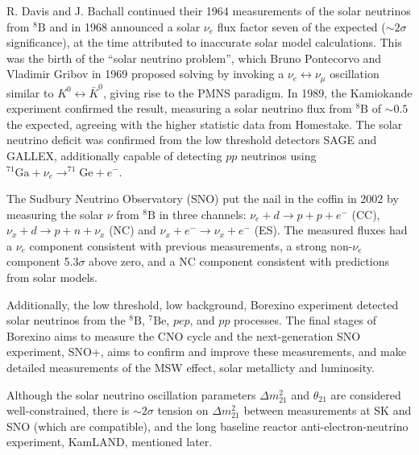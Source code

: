 R. Davis and J. Bachall continued their 1964 measurements\cite{davis} of the solar neutrinos from $^{8}\text{B}$ and in 1968\cite{davis_sun} announced a solar $\nu_e$ flux factor seven of the expected ($\sim2\sigma$ significance), at the time attributed to inaccurate solar model calculations. This was the birth of the ``solar neutrino problem'', which Bruno Pontecorvo and Vladimir Gribov in 1969\cite{pontecorvo_gribov} proposed solving by invoking a $\nu_e\leftrightarrow\nu_\mu$ oscillation similar to $K^0 \leftrightarrow\bar{K}^0$, giving rise to the PMNS paradigm. In 1989, the Kamiokande experiment\cite{kamiokande_solar} confirmed the result, measuring a solar neutrino flux from $^{8}\text{B}$  of $\sim0.5$ the expected, agreeing with the higher statistic data from Homestake\cite{davis_sun2}. The solar neutrino deficit was confirmed from the low threshold detectors SAGE\cite{sage_solar} and GALLEX\cite{gallex_solar}, additionally capable of detecting $p p$ neutrinos using $^{71}\text{Ga}+\nu_e \rightarrow ^{71}\text{Ge}+e^-$.

The Sudbury Neutrino Observatory (SNO) put the nail in the coffin in 2002\cite{sno_solar} by measuring the solar $\nu$ from $^{8}\text{B}$ in three channels: $\nu_e + d \rightarrow p+p+e^-$ (CC), $\nu_x + d\rightarrow p+ n + \nu_x$ (NC) and $\nu_x + e^- \rightarrow \nu_x+e^-$ (ES). The measured fluxes had a $\nu_e$ component consistent with previous measurements, a strong non-$\nu_e$ component 5.3$\sigma$ above zero, and a NC component consistent with predictions from solar models.

Additionally, the low threshold, low background, Borexino experiment detected solar neutrinos from the $^{8}\text{B}$, $^{7}\text{Be}$, $pep$, and $pp$ processes\cite{borexino_summary}. The final stages of Borexino aims to measure the CNO cycle and the next-generation SNO experiment, SNO+, aims to confirm and improve these measurements, and make detailed measurements of the MSW effect, solar metallicty and luminosity.

Although the solar neutrino oscillation parameters $\Delta m^2_{21}$ and $\theta_{21}$ are considered well-constrained, there is $\sim 2\sigma$ tension on $\Delta m^2_{21}$ between measurements at SK and SNO (which are compatible), and the long baseline reactor anti-electron-neutrino experiment, KamLAND\cite{m2_tension}, mentioned later.

